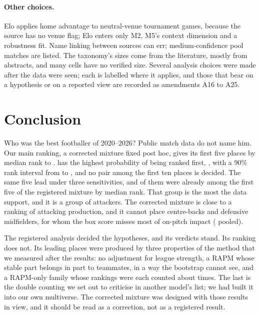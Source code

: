 \documentclass[11pt,a4paper]{article}
\begin{document}
\paragraph{Other choices.}
Elo applies home advantage to neutral-venue tournament games, because the
source has no venue flag; Elo enters only M2, M5's context dimension and a
robustness fit. Name linking between sources can err; medium-confidence pool
matches are listed. The taxonomy's sizes come from the literature, mostly from
abstracts, and many cells have no verified size. Several analysis choices were
made after the data were seen; each is labelled where it applies, and those
that bear on a hypothesis or on a reported view are recorded as amendments A16
to A25.

\section{Conclusion}
\label{sec:conclusion}

Who was the best footballer of 2020--2026? Public match data do not name him.
Our main ranking, a corrected mixture fixed post hoc, gives its first five
places by median rank to \CorrectedTopFive{}. \CorrectedTopName{} has the
highest probability of being ranked first, \CorrectedTopPFirst{}, with a 90\%
rank interval from \CorrectedTopRankLo{} to \CorrectedTopRankHi{}, and no
pair among the first ten places is decided. The same five lead under three
sensitivities, and \CorrectedTopFiveInRegistered{} of them were already among
the first five of the registered mixture by median rank. That group is the
most the data support, and it is a group of attackers. The corrected mixture
is close to a ranking of attacking production, and it cannot place
centre-backs and defensive midfielders, for whom the box score misses most of
on-pitch impact (\ShareHigh{} pooled).

The registered analysis decided the hypotheses, and its verdicts stand. Its
ranking does not. Its leading places were produced by three properties of the
method that we measured after the results: no adjustment for league strength,
a RAPM whose stable part belongs in part to teammates, in a way the bootstrap
cannot see, and a RAPM-only family whose rankings were each counted about
\ImpactRepeatMean{} times. The
last is the double counting we set out to criticise in another model's list;
we had built it into our own multiverse. The corrected mixture was designed
with those results in view, and it should be read as a correction, not as a
registered result.
\end{document}
